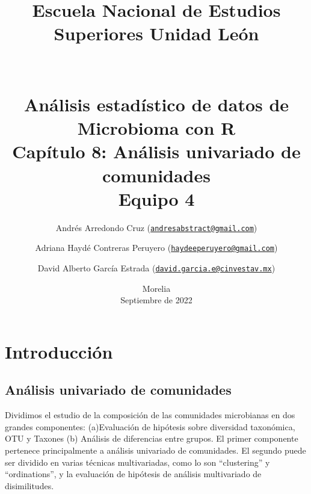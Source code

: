 \documentclass[
]{article}
\author{Andrés Arredondo Cruz
(\href{mailto:andresabstract@gmail.com}{\nolinkurl{andresabstract@gmail.com}}) \and Adriana
Haydé Contreras Peruyero
(\href{mailto:haydeeperuyero@gmail.com}{\nolinkurl{haydeeperuyero@gmail.com}}) \and David
Alberto García Estrada
(\href{mailto:david.garcia.e@cinvestav.mx}{\nolinkurl{david.garcia.e@cinvestav.mx}})}
\date{}
\begin{document}
\newcommand{\cb}{\color{blue}}
\newcommand{\cg}{\color{green}}
\newcommand{\cvi}{\color{violet}}

\title{ {\sc Escuela Nacional de Estudios Superiores Unidad León}\\
\vspace{1cm}{\sc Centro de Ciencias Matemáticas }\\ 
\vspace{1cm}{\sc UGA-LANGEBIO CINVESTAV}\\
  \vspace{1cm} {Análisis estadístico de datos de Microbioma con R}\\
   \vspace{1.5cm} {Capítulo 8: Análisis univariado de comunidades} \\[2cm]
       \vspace{1.5cm} {Equipo 4}\\
       }

\date{\vspace{5.5cm} Morelia\\
      \vspace{1cm} Septiembre de 2022}

\maketitle

\thispagestyle{fancy}
\newpage

\tableofcontents
\newpage

\hypertarget{introducciuxf3n}{%
\section{Introducción}\label{introducciuxf3n}}

\hypertarget{anuxe1lisis-univariado-de-comunidades}{%
\subsection{Análisis univariado de
comunidades}\label{anuxe1lisis-univariado-de-comunidades}}

Dividimos el estudio de la composición de las comunidades microbianas en
dos grandes componentes: (a)Evaluación de hipótesis sobre diversidad
taxonómica, OTU y Taxones (b) Análisis de diferencias entre grupos. El
primer componente pertenece principalmente a análisis univariado de
comunidades. El segundo puede ser dividido en varias técnicas
multivariadas, como lo son ``clustering'' y ``ordinations'', y la
evaluación de hipótesis de análisis multivariado de disimilitudes.
\end{document}

